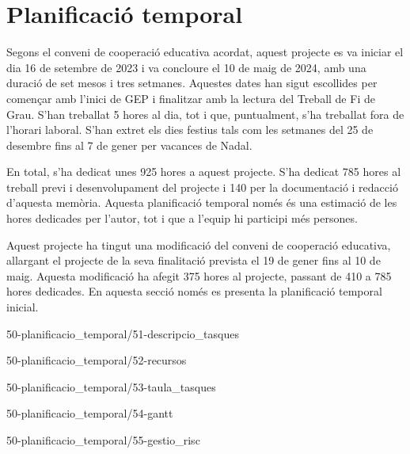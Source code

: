 \chapter{Planificació temporal}

Segons el conveni de cooperació educativa acordat, aquest projecte es va iniciar el dia 16 de setembre de 2023 i va concloure el 10 de maig de 2024, amb una duració de set mesos i tres setmanes. Aquestes dates han sigut escollides per començar amb l'inici de GEP i finalitzar amb la lectura del Treball de Fi de Grau. S'han treballat 5 hores al dia, tot i que, puntualment, s'ha treballat fora de l'horari laboral. S'han extret els dies festius tals com les setmanes del 25 de desembre fins al 7 de gener per vacances de Nadal.

En total, s'ha dedicat unes 925 hores a aquest projecte. S'ha dedicat 785 hores al treball previ i desenvolupament del projecte i 140 per la documentació i redacció d'aquesta memòria. Aquesta planificació temporal només és una estimació de les hores dedicades per l'autor, tot i que a l'equip hi participi més persones.

Aquest projecte ha tingut una modificació del conveni de cooperació educativa, allargant el projecte de la seva finalitació prevista el 19 de gener fins al 10 de maig. Aquesta modificació ha afegit 375 hores al projecte, passant de 410 a 785 hores dedicades. En aquesta secció només es presenta la planificació temporal inicial.

{50-planificacio_temporal/51-descripcio_tasques}

{50-planificacio_temporal/52-recursos}

{50-planificacio_temporal/53-taula_tasques}

{50-planificacio_temporal/54-gantt}

{50-planificacio_temporal/55-gestio_risc}
